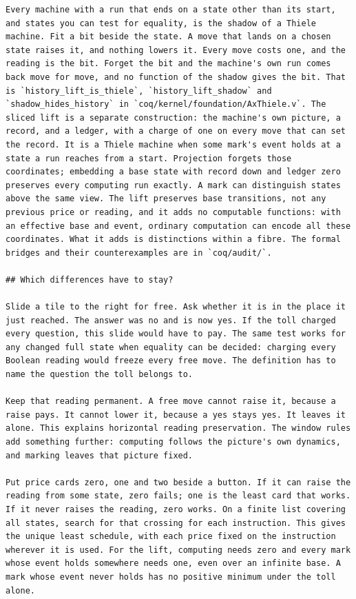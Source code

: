 \documentclass[11pt,twoside]{article}
\theoremstyle{thielethm}
\theoremstyle{thieledef}
\theoremstyle{thieledef}
\theoremstyle{thieledef}
\theoremstyle{thielethm}
\theoremstyle{thieleobs}
\theoremstyle{thielethm}
\begin{document}
\begin{small}
\begin{verbatim}
Every machine with a run that ends on a state other than its start, and states you can test for equality, is the shadow of a Thiele machine. Fit a bit beside the state. A move that lands on a chosen state raises it, and nothing lowers it. Every move costs one, and the reading is the bit. Forget the bit and the machine's own run comes back move for move, and no function of the shadow gives the bit. That is `history_lift_is_thiele`, `history_lift_shadow` and `shadow_hides_history` in `coq/kernel/foundation/AxThiele.v`. The sliced lift is a separate construction: the machine's own picture, a record, and a ledger, with a charge of one on every move that can set the record. It is a Thiele machine when some mark's event holds at a state a run reaches from a start. Projection forgets those coordinates; embedding a base state with record down and ledger zero preserves every computing run exactly. A mark can distinguish states above the same view. The lift preserves base transitions, not any previous price or reading, and it adds no computable functions: with an effective base and event, ordinary computation can encode all these coordinates. What it adds is distinctions within a fibre. The formal bridges and their counterexamples are in `coq/audit/`.

## Which differences have to stay?

Slide a tile to the right for free. Ask whether it is in the place it just reached. The answer was no and is now yes. If the toll charged every question, this slide would have to pay. The same test works for any changed full state when equality can be decided: charging every Boolean reading would freeze every free move. The definition has to name the question the toll belongs to.

Keep that reading permanent. A free move cannot raise it, because a raise pays. It cannot lower it, because a yes stays yes. It leaves it alone. This explains horizontal reading preservation. The window rules add something further: computing follows the picture's own dynamics, and marking leaves that picture fixed.

Put price cards zero, one and two beside a button. If it can raise the reading from some state, zero fails; one is the least card that works. If it never raises the reading, zero works. On a finite list covering all states, search for that crossing for each instruction. This gives the unique least schedule, with each price fixed on the instruction wherever it is used. For the lift, computing needs zero and every mark whose event holds somewhere needs one, even over an infinite base. A mark whose event never holds has no positive minimum under the toll alone.


\end{verbatim}
\end{small}
\end{document}
